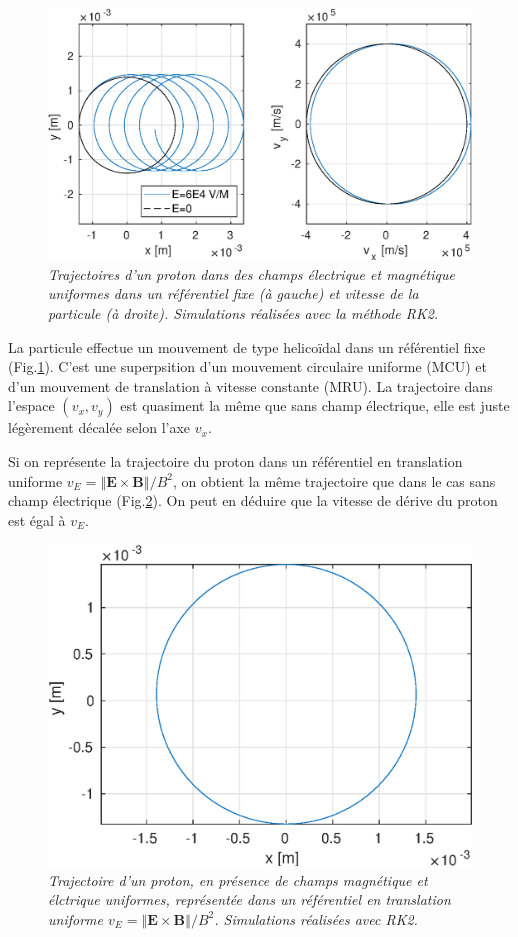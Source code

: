 \documentclass[a4paper,12pt,oneside]{article}
\newcommand{\norme}[1]{\left\Vert #1 \right\Vert}
\begin{document}
\begin{figure}[H]
\centerline{\includegraphics[width=0.85\linewidth,angle=0]{application1/RK2XY1}}
\caption{ \label{RK2XY1}\em
 Trajectoires d'un proton dans des champs électrique et magnétique uniformes dans un référentiel fixe (à gauche) et vitesse de la particule (à droite). Simulations réalisées avec la méthode RK2.
}
\end{figure}
La particule effectue un mouvement de type helicoïdal dans un référentiel fixe (Fig.\ref{RK2XY1}). C'est une superpsition d'un mouvement circulaire uniforme (MCU) et d'un mouvement de translation à vitesse constante (MRU). La trajectoire dans l'espace $(v_x,v_y)$ est quasiment la même que sans champ électrique, elle est juste légèrement décalée selon l'axe $v_x$.

Si on représente la trajectoire du proton dans un référentiel en translation uniforme $v_E=\norme{\textbf{E} \times \textbf{B}}/B^2$, on obtient la même trajectoire que dans le cas sans champ électrique (Fig.\ref{RK2XYvE1}). On peut en déduire que la vitesse de dérive du proton est égal à $v_E$.
\begin{figure}[H]
\centerline{\includegraphics[width=0.55\linewidth,angle=0]{application1/RK2XYvE1}}
\caption{ \label{RK2XYvE1}\em
 Trajectoire d'un proton, en présence de champs magnétique et élctrique uniformes, représentée dans un référentiel en translation uniforme $v_E=\norme{\textbf{E} \times \textbf{B}}/B^2$. Simulations réalisées avec RK2.
}
\end{figure}
\end{document}
